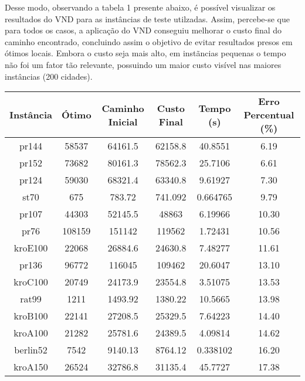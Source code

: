 \documentclass[10pt]{extarticle} %
\begin{document}
Desse modo, observando a tabela 1 presente abaixo, é possível visualizar os resultados do VND para as instâncias de teste utilzadas. Assim, percebe-se que para todos os casos, a aplicação do VND conseguiu melhorar o custo final do caminho encontrado, concluindo assim o objetivo de evitar resultados presos em ótimos locais. Embora o custo seja mais alto, em instãncias pequenas o tempo não foi um fator tão relevante, possuindo um maior custo visível nas maiores instâncias (200 cidades).

\begin{table}[h]
    \centering
    \begin{tabular}{|c|c|c|c|c|c|} \hline 
         \textbf{Instância} & \textbf{Ótimo} & \textbf{Caminho Inicial} & \textbf{Custo Final} & \textbf{Tempo (s)} & \textbf{Erro Percentual (\%)} \\ \hline 
         pr144      & 58537    & 64161.5      & 62158.8    & 40.8551   & 6.19  \\ \hline
         pr152      & 73682    & 80161.3      & 78562.3    & 25.7106   & 6.61  \\ \hline
         pr124      & 59030    & 68321.4      & 63340.8    & 9.61927   & 7.30  \\ \hline
         st70       & 675      & 783.72       & 741.092    & 0.664765  & 9.79  \\ \hline
         pr107      & 44303    & 52145.5      & 48863      & 6.19966   & 10.30 \\ \hline
         pr76       & 108159   & 151142       & 119562     & 1.72431   & 10.56 \\ \hline
         kroE100    & 22068    & 26884.6      & 24630.8    & 7.48277   & 11.61 \\ \hline
         pr136      & 96772    & 116045       & 109462     & 20.6047   & 13.10 \\ \hline
         kroC100    & 20749    & 24173.9      & 23554.8    & 3.51075   & 13.53 \\ \hline
         rat99      & 1211     & 1493.92      & 1380.22    & 10.5665   & 13.98 \\ \hline
         kroB100    & 22141    & 27208.5      & 25329.5    & 7.64223   & 14.40 \\ \hline
         kroA100    & 21282    & 25781.6      & 24389.5    & 4.09814   & 14.62 \\ \hline
         berlin52   & 7542     & 9140.13      & 8764.12    & 0.338102  & 16.20 \\ \hline
         kroA150    & 26524    & 32786.8      & 31135.4    & 45.7727   & 17.38 \\ \hline

\end{tabular}
\end{table}
\end{document}
